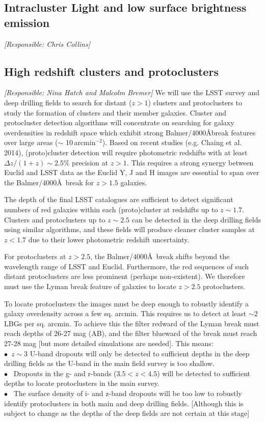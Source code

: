 \documentclass[a4paper,11pt]{article}
\begin{document}
\subsection{Intracluster Light and low surface brightness emission}

{\it [Responsible: Chris Collins]}

\subsection{High redshift clusters and protoclusters}

{\it [Responsible: Nina Hatch and Malcolm Bremer]}
\noindent We will use the LSST survey and deep drilling fields to search for distant ($z >1$) clusters and protoclusters to study the formation of clusters and their member galaxies. Cluster and protocluster detection algorithms will concentrate on searching for galaxy overdensities in redshift space which exhibit strong Balmer/4000\AA break features over large areas ($\sim$ 10\,arcmin$^{-2}$). Based on recent studies (e.g. Chaing et al. 2014), (proto)cluster detection will require photometric redshifts with at least $\Delta z/ (1+z)\sim2.5$\% precision at $z>1$. This requires a strong synergy between Euclid and LSST data as the Euclid Y, J and H images are essential to span over the Balmer/4000\AA\ break for $z>1.5$ galaxies.  

The depth of the final LSST catalogues are sufficient to detect significant numbers of red galaxies within each (proto)cluster at redshifts up to $z\sim1.7$. Clusters and protoclusters up to $z\sim2.5$ can be detected in the deep drilling fields using similar algorithms, and these fields  will produce cleaner cluster samples at $z<1.7$ due to their lower photometric redshift uncertainty.

For protoclusters at $z>2.5$, the Balmer/$4000$\AA\ break shifts beyond the wavelength range of LSST and Euclid. Furthermore, the red sequences of such distant protoclusters are less prominent (perhaps non-existent). We therefore must use the Lyman break feature of galaxies to locate $z>2.5$ protoclusters.

To locate protoclusters the images must be deep enough to robustly identify a galaxy overdensity across a few sq. arcmin. This requires us to detect at least $\sim2$ LBGs per sq. arcmin. To achieve this the filter redward of the Lyman break must reach depths of 26-27 mag (AB), and the filter blueward of the break must reach 27-28 mag [but more detailed simulations are needed]. This means:\\
\noindent $\bullet$~$z\sim3$ U-band dropouts will only be detected to sufficient depths in the deep drilling fields as the U-band in the main field survey is too shallow. \\
\noindent $\bullet$ ~Dropouts in the g- and r-bands  ($3.5<z<4.5$) will be detected to sufficient depths to locate protoclusters in the main survey. \\
\noindent $\bullet$ ~The surface density of i- and z-band dropouts will be too low to robustly identify protoclusters in both main and deep drilling fields. [Although this is subject to change as the depths of the deep fields are not certain at this stage]
\end{document}
